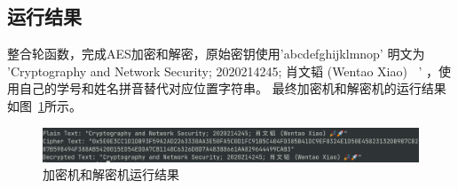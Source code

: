 \documentclass[degree=project,degree-type=project,cjk-font=noto]{thuthesis}
\begin{document}
\subsection{运行结果}

整合轮函数，完成AES加密和解密，原始密钥使用'abcdefghijklmnop'
明文为 'Cryptography and Network Security; 2020214245; 肖文韬 (Wentao Xiao) 🎉🚀' ，使用自己的学号和姓名拼音替代对应位置字符串。
最终加密机和解密机的运行结果如图~\ref{fig:t4}所示。

\begin{figure}[h]
\centering%
\includegraphics[width=\linewidth]{aes_t4.png}
  \caption{加密机和解密机运行结果}
  \label{fig:t4}
\end{figure}

\backmatter

\end{document}
